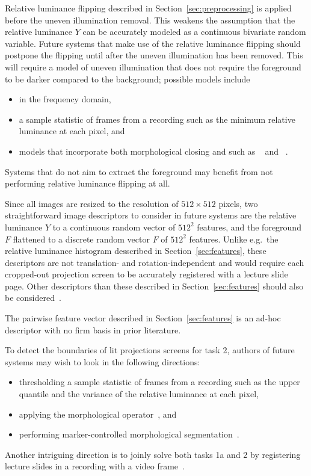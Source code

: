Relative luminance flipping described in Section~\ref{sec:preprocessing} is
applied before the uneven illumination removal. This weakens the assumption that
the relative luminance $Y$ can be accurately modeled as a continuous bivariate
random variable. Future systems that make use of the relative luminance
flipping should postpone the flipping until after the uneven illumination has
been removed. This will require a model of uneven illumination that does not
require the foreground to be darker compared to the background; possible models
include
\begin{itemize}
  \item {} in the frequency domain,
  \item a sample statistic of frames from a recording such as the minimum
    relative luminance at each pixel, and
  \item models that incorporate both morphological closing and
     such as
    ~\cite[sec.~8.5]{soille2013morphological} and
    ~\cite[sec.~8.2.2]{soille2013morphological}.
\end{itemize}
Systems that do not aim to extract the foreground may benefit from not
performing relative luminance flipping at all.

Since all images are resized to the resolution of $512\times 512$ pixels, two
straightforward image descriptors to consider in future systems are the
relative luminance $Y$  to a continuous random vector of
$512^2$ features, and the foreground $F$ flattened to a discrete random vector
$F$ of $512^2$ features. Unlike e.g.\ the relative luminance histogram
desscribed in Section~\ref{sec:features}, these descriptors are not
translation- and rotation-independent and would require each cropped-out
projection screen to be accurately registered with a lecture slide page. Other
descriptors than these described in Section~\ref{sec:features} should also be
considered~\cite{pass1999comparing}.

The pairwise feature vector described in Section~\ref{sec:features} is an
ad-hoc descriptor with no firm basis in prior literature.

To detect the boundaries of lit projections screens for task 2, authors of
future systems may wish to look in the following directions:
\begin{itemize}
  \item thresholding a sample statistic of frames from a recording such
    as the upper quantile and the variance of the relative luminance at each pixel,
  \item applying the  morphological
    operator~\cite[sec.~6.3.4]{soille2013morphological}, and
  \item performing marker-controlled morphological
    segmentation~\cite[sec.~9.3]{soille2013morphological}.
\end{itemize}
Another intriguing direction is to joinly solve both tasks 1a and 2 by
registering lecture slides in a recording with a video
frame~\cite{wolberg2000robust,zokai2004robust,matas2004robust}.

